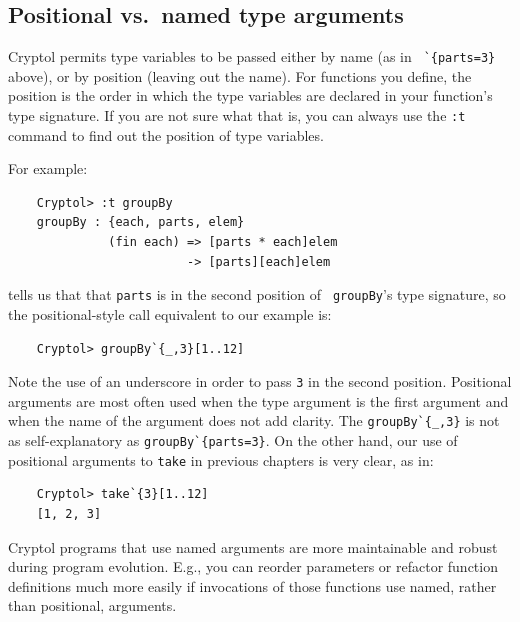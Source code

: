 \subsection{Positional vs.\ named type
  arguments}\indTypePositionalArguments
\label{sec:positional-vs.-named}

Cryptol permits type variables to be passed either by name (as in {\tt
  \Verb|`{parts=3}|} above), or by position (leaving out the name).
For functions you define, the position is the order in which the type
variables are declared in your function's type signature. If you are
not sure what that is, you can always use the {\tt :t} command to find
out the position of type variables.

For example:
\begin{Verbatim}
    Cryptol> :t groupBy
    groupBy : {each, parts, elem}
              (fin each) => [parts * each]elem
                         -> [parts][each]elem
\end{Verbatim}
tells us that that {\tt parts} is in the second position of {\tt
  groupBy}'s type signature, so the positional-style call equivalent
to our example is:
\begin{Verbatim}
    Cryptol> groupBy`{_,3}[1..12]
\end{Verbatim}

Note the use of an underscore in order to pass \texttt{3} in the
second position.  Positional arguments are most often used when the
type argument is the first argument and when the name of the argument
does not add clarity.  The {\tt groupBy\Verb|`{_,3}|} is not as
self-explanatory as {\tt groupBy\Verb|`{parts=3}|}.  On the other hand, our
use of positional arguments to {\tt take} in previous chapters is very
clear, as in:
\begin{Verbatim}
    Cryptol> take`{3}[1..12]
    [1, 2, 3]
\end{Verbatim}

\begin{tip}
  Cryptol programs that use named arguments are more maintainable and
  robust during program evolution.  E.g., you can reorder parameters or
  refactor function definitions much more easily if invocations of
  those functions use named, rather than positional, arguments.
\end{tip}


